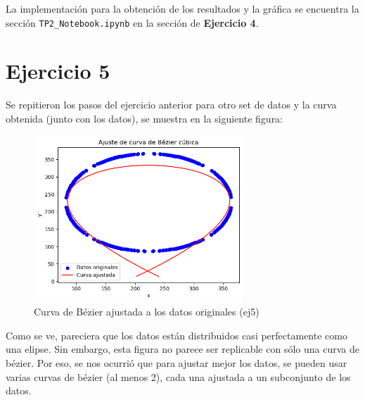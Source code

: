 \documentclass{article}
\begin{document}
La implementación para la obtención de los resultados y la gráfica se encuentra la sección \texttt{TP2\_Notebook.ipynb} en la sección de \textbf{Ejercicio 4}.

\section{Ejercicio 5}
Se repitieron los pasos del ejercicio anterior para otro set de datos y la curva obtenida (junto con los datos), se muestra en la siguiente figura:

\begin{figure}[H]
    \centering
    \includegraphics[width=0.7\textwidth]{Imagenes/ej5.png}
    \caption{Curva de Bézier ajustada a los datos originales (ej5)}
\end{figure}

Como se ve, pareciera que los datos están distribuidos casi perfectamente como una elipse. Sin embargo, esta figura no parece ser replicable con sólo una curva de bézier. Por eso, se nos ocurrió que para ajustar mejor los datos, se pueden usar varias curvas de bézier (al menos 2), cada una ajustada a un subconjunto de los datos. 
\end{document}
